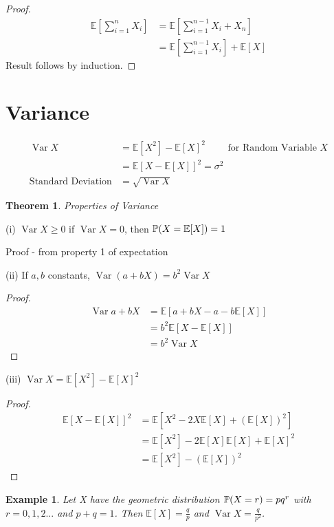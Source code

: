 \documentclass{notes}
\theoremstyle{plain}
\newtheorem{theorem}{Theorem}[chapter]
\newtheorem*{example}{Example}
\newcommand{\bP}{\mathbb{P}}
\newcommand{\bE}{\mathbb{E}}
\newcommand{\prob}[1]{\bP \negthinspace\left(#1\right)}
\newcommand{\expect}[1]{\bE\!\left[#1\right]}
\DeclareMathOperator{\var}{Var}
\begin{document}
\begin{proof}
\begin{align*}
\expect{\sum_{i=1}^n X_i} &=\expect{\sum_{i=1}^{n-1} X_i + X_n}\\
&=\expect{\sum_{i=1}^{n-1} X_i} +\expect{X}
\end{align*}
Result follows by induction.
\end{proof}

\section{Variance}

\begin{align*}
\var{X} &= \expect{X^2}-\expect{X}^2 \qquad \text{ for Random Variable $X$}\\
&=\expect{X - \expect{X}}^2 = \sigma^2\\
\text{Standard Deviation} &=\sqrt{\var{X}}
\end{align*}

\begin{theorem}
Properties of Variance \hfill
\end{theorem}
(i) $\var{X} \geq 0 $ if $\var{X} = 0$, then $\prob{X=\expect{X}} = 1$

Proof - from property 1 of expectation \hfill

(ii) If $a,b$ constants, $\var{(a + bX)} = b^2 \var{X}$

\begin{proof}
\begin{align*}
\var{a + bX}& = \expect{ a + bX -a -b\expect{X}}\\
&=b^2\expect{X -\expect{X}}\\
&= b^2 \var{X}
\end{align*}
\end{proof}

(iii) $\var{X} = \expect{X^2}- {\expect{X}}^2$

\begin{proof}

\begin{align*}
\expect{X - \expect{X}}^2 &= \expect{ X^2-2X\expect{X} + (\expect{X})^2}\\
&=\expect{X^2} - 2\expect{X}\expect{X} + {\expect{X}}^2\\
&=\expect{X^2} -(\expect{X})^2
\end{align*}
\end{proof}

\begin{example}
Let X have the geometric distribution $\prob{X=r} = pq^r$ with $r =
0,1,2...$ and $ p+q=1$.  Then $\expect{X} = \tfrac{q}{p}$
and $\var{X} = \tfrac{q}{p^2}$.
\end{example}
\end{document}
